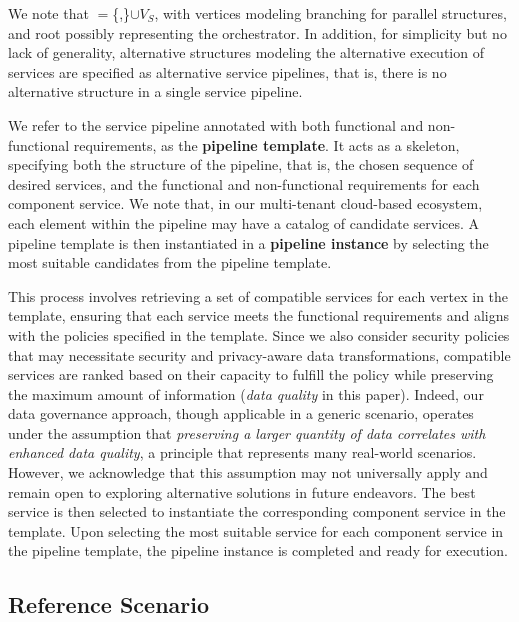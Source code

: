 \vspace{0.5em}

We note that \V$=$\{,\}$\cup$$V_S$, with vertices  modeling branching for parallel structures, and root  possibly representing the orchestrator. In addition, for simplicity but no lack of generality, alternative structures modeling the alternative execution of services are specified as alternative service pipelines, that is, there is no alternative structure in a single service pipeline.

We refer to the service pipeline annotated with both functional and non-functional requirements, as the \textbf{pipeline template}. It acts as a skeleton, specifying both the structure of the pipeline, that is, the chosen sequence of desired services, and the functional and non-functional requirements for each component service. We note that, in our multi-tenant cloud-based ecosystem, each element within the pipeline may have a catalog of candidate services. A pipeline template is then instantiated in a \textbf{pipeline instance} by selecting the most suitable candidates from the pipeline template.

This process involves retrieving a set of compatible services for each vertex in the template, ensuring that each service meets the functional requirements and aligns with the policies specified in the template. Since we also consider security policies that may necessitate security and privacy-aware data transformations, compatible services are ranked based on their capacity to fulfill the policy while preserving the maximum amount of information (\emph{data quality} in this paper). Indeed, our data governance approach, though applicable in a generic scenario, operates under the assumption that \textit{preserving a larger quantity of data correlates with enhanced data quality}, a principle that represents many real-world scenarios. However, we acknowledge that this assumption may not universally apply and remain open to exploring alternative solutions in future endeavors.
%
The best service is then selected to instantiate the corresponding component service in the template.
Upon selecting the most suitable service for each component service in the pipeline template, the pipeline instance is completed and ready for execution.

\subsection{Reference Scenario}\label{sec:service_definition}

